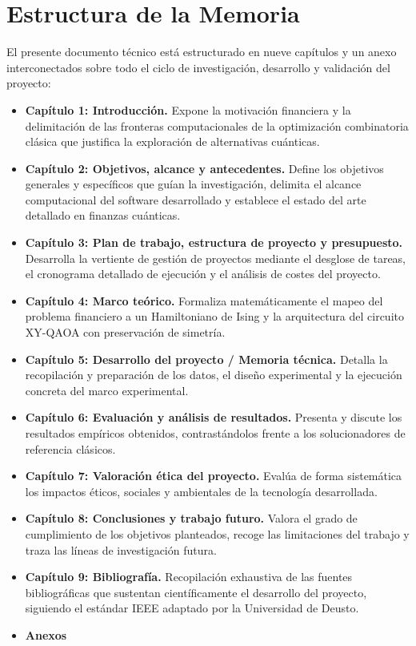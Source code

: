 \section{Estructura de la Memoria}
\label{sec:estructura_memoria}

El presente documento técnico está estructurado en nueve capítulos y un anexo interconectados sobre todo el ciclo de investigación, desarrollo y validación del proyecto:

\begin{itemize}
    \item \textbf{Capítulo 1: Introducción.} Expone la motivación financiera y la delimitación de las fronteras computacionales de la optimización combinatoria clásica que justifica la exploración de alternativas cuánticas.
    \item \textbf{Capítulo 2: Objetivos, alcance y antecedentes.} Define los objetivos generales y específicos que guían la investigación, delimita el alcance computacional del software desarrollado y establece el estado del arte detallado en finanzas cuánticas.
    \item \textbf{Capítulo 3: Plan de trabajo, estructura de proyecto y presupuesto.} Desarrolla la vertiente de gestión de proyectos mediante el desglose de tareas, el cronograma detallado de ejecución y el análisis de costes del proyecto.
    \item \textbf{Capítulo 4: Marco teórico.} Formaliza matemáticamente el mapeo del problema financiero a un Hamiltoniano de Ising y la arquitectura del circuito XY-QAOA con preservación de simetría.
    \item \textbf{Capítulo 5: Desarrollo del proyecto / Memoria técnica.} Detalla la recopilación y preparación de los datos, el diseño experimental y la ejecución concreta del marco experimental.
    \item \textbf{Capítulo 6: Evaluación y análisis de resultados.} Presenta y discute los resultados empíricos obtenidos, contrastándolos frente a los solucionadores de referencia clásicos.
    \item \textbf{Capítulo 7: Valoración ética del proyecto.} Evalúa de forma sistemática los impactos éticos, sociales y ambientales de la tecnología desarrollada.
    \item \textbf{Capítulo 8: Conclusiones y trabajo futuro.} Valora el grado de cumplimiento de los objetivos planteados, recoge las limitaciones del trabajo y traza las líneas de investigación futura.
    \item \textbf{Capítulo 9: Bibliografía.} Recopilación exhaustiva de las fuentes bibliográficas que sustentan científicamente el desarrollo del proyecto, siguiendo el estándar IEEE adaptado por la Universidad de Deusto.
    \item \textbf{Anexos}
\end{itemize}